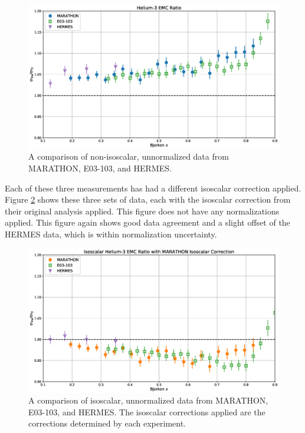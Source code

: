 \begin{figure}[p]
	\includegraphics[width=\textwidth]{./results/fig/rawcomp.eps}
	\caption{A comparison of non-isoscalar, unnormalized data from MARATHON, E03-103, and HERMES.}
	\label{fig:rawcomp}
\end{figure}

Each of these three measurements has had a different isoscalar correction applied. Figure \ref{fig:isocomp} shows these three sets of data, each with the isoscalar correction from their original analysis applied. This figure does not have any normalizations applied. This figure again shows good data agreement and a slight offset of the HERMES data, which is within normalization uncertainty.

\begin{figure}[p]
	\includegraphics[width=\textwidth]{./results/fig/iso_comp.eps}
	\caption{A comparison of isoscalar, unnormalized data from MARATHON, E03-103, and HERMES. The isoscalar corrections applied are the corrections determined by each experiment.}
	\label{fig:isocomp}
\end{figure}

